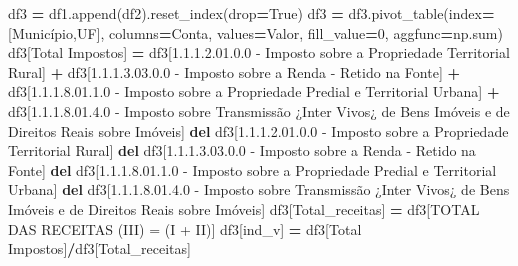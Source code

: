 \documentclass[
  12,
  dvipsnames]{article}
\newenvironment{Shaded}{\begin{snugshade}}{\end{snugshade}}
\newcommand{\BuiltInTok}[1]{#1}
\newcommand{\DecValTok}[1]{\textcolor[rgb]{0.00,0.00,0.81}{#1}}
\newcommand{\KeywordTok}[1]{\textcolor[rgb]{0.13,0.29,0.53}{\textbf{#1}}}
\newcommand{\NormalTok}[1]{#1}
\newcommand{\OperatorTok}[1]{\textcolor[rgb]{0.81,0.36,0.00}{\textbf{#1}}}
\newcommand{\StringTok}[1]{\textcolor[rgb]{0.31,0.60,0.02}{#1}}
\newcommand{\VariableTok}[1]{\textcolor[rgb]{0.00,0.00,0.00}{#1}}
\begin{document}
\begin{Shaded}
\begin{Highlighting}[]
\NormalTok{    df3 }\OperatorTok{=}\NormalTok{ df1.append(df2).reset\_index(drop}\OperatorTok{=}\VariableTok{True}\NormalTok{)}
\NormalTok{    df3 }\OperatorTok{=}\NormalTok{ df3.pivot\_table(index}\OperatorTok{=}\NormalTok{[}\StringTok{\textquotesingle{}Município\textquotesingle{}}\NormalTok{,}\StringTok{\textquotesingle{}UF\textquotesingle{}}\NormalTok{], columns}\OperatorTok{=}\StringTok{\textquotesingle{}Conta\textquotesingle{}}\NormalTok{, values}\OperatorTok{=}\StringTok{\textquotesingle{}Valor\textquotesingle{}}\NormalTok{,}
\NormalTok{                          fill\_value}\OperatorTok{=}\DecValTok{0}\NormalTok{, aggfunc}\OperatorTok{=}\NormalTok{np.}\BuiltInTok{sum}\NormalTok{)}
\NormalTok{    df3[}\StringTok{\textquotesingle{}Total Impostos\textquotesingle{}}\NormalTok{] }\OperatorTok{=}\NormalTok{ df3[}\StringTok{\textquotesingle{}1.1.1.2.01.0.0 {-} Imposto sobre a Propriedade Territorial Rural\textquotesingle{}}\NormalTok{] }\OperatorTok{+}\NormalTok{ df3[}\StringTok{\textquotesingle{}1.1.1.3.03.0.0 {-} Imposto sobre a Renda {-} Retido na Fonte\textquotesingle{}}\NormalTok{] }\OperatorTok{+}\NormalTok{ df3[}\StringTok{\textquotesingle{}1.1.1.8.01.1.0 {-} Imposto sobre a Propriedade Predial e Territorial Urbana\textquotesingle{}}\NormalTok{] }\OperatorTok{+}\NormalTok{ df3[}\StringTok{\textquotesingle{}1.1.1.8.01.4.0 {-} Imposto sobre Transmissão ¿Inter Vivos¿ de Bens Imóveis e de Direitos Reais sobre Imóveis\textquotesingle{}}\NormalTok{]}
    \KeywordTok{del}\NormalTok{ df3[}\StringTok{\textquotesingle{}1.1.1.2.01.0.0 {-} Imposto sobre a Propriedade Territorial Rural\textquotesingle{}}\NormalTok{]}
    \KeywordTok{del}\NormalTok{ df3[}\StringTok{\textquotesingle{}1.1.1.3.03.0.0 {-} Imposto sobre a Renda {-} Retido na Fonte\textquotesingle{}}\NormalTok{]}
    \KeywordTok{del}\NormalTok{ df3[}\StringTok{\textquotesingle{}1.1.1.8.01.1.0 {-} Imposto sobre a Propriedade Predial e Territorial Urbana\textquotesingle{}}\NormalTok{] }
    \KeywordTok{del}\NormalTok{ df3[}\StringTok{\textquotesingle{}1.1.1.8.01.4.0 {-} Imposto sobre Transmissão ¿Inter Vivos¿ de Bens Imóveis e de Direitos Reais sobre Imóveis\textquotesingle{}}\NormalTok{]}
\NormalTok{    df3[}\StringTok{\textquotesingle{}Total\_receitas\textquotesingle{}}\NormalTok{] }\OperatorTok{=}\NormalTok{ df3[}\StringTok{\textquotesingle{}TOTAL DAS RECEITAS (III) = (I + II)\textquotesingle{}}\NormalTok{]}
\NormalTok{    df3[}\StringTok{\textquotesingle{}ind\_v\textquotesingle{}}\NormalTok{] }\OperatorTok{=}\NormalTok{ df3[}\StringTok{\textquotesingle{}Total Impostos\textquotesingle{}}\NormalTok{]}\OperatorTok{/}\NormalTok{df3[}\StringTok{\textquotesingle{}Total\_receitas\textquotesingle{}}\NormalTok{]}
    

\end{Highlighting}
\end{Shaded}
\end{document}
